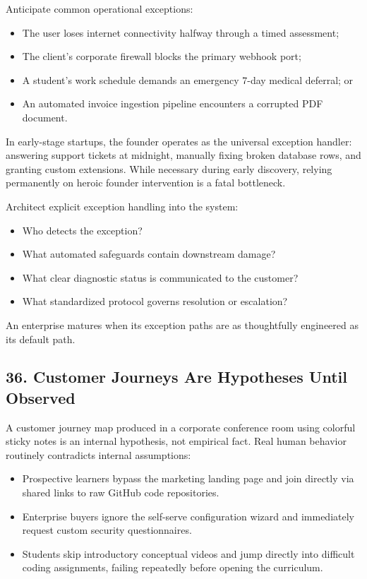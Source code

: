 Anticipate common operational exceptions:
\begin{itemize}
    \item The user loses internet connectivity halfway through a timed assessment;
    \item The client's corporate firewall blocks the primary webhook port;
    \item A student's work schedule demands an emergency 7-day medical deferral; or
    \item An automated invoice ingestion pipeline encounters a corrupted PDF document.
\end{itemize}

In early-stage startups, the founder operates as the universal exception handler: answering support tickets at midnight, manually fixing broken database rows, and granting custom extensions. While necessary during early discovery, relying permanently on heroic founder intervention is a fatal bottleneck.

Architect explicit exception handling into the system:
\begin{itemize}
    \item Who detects the exception?
    \item What automated safeguards contain downstream damage?
    \item What clear diagnostic status is communicated to the customer?
    \item What standardized protocol governs resolution or escalation?
\end{itemize}

An enterprise matures when its exception paths are as thoughtfully engineered as its default path.

\subsection*{36. Customer Journeys Are Hypotheses Until Observed}

A customer journey map produced in a corporate conference room using colorful sticky notes is an internal hypothesis, not empirical fact. Real human behavior routinely contradicts internal assumptions:
\begin{itemize}
    \item Prospective learners bypass the marketing landing page and join directly via shared links to raw GitHub code repositories.
    \item Enterprise buyers ignore the self-serve configuration wizard and immediately request custom security questionnaires.
    \item Students skip introductory conceptual videos and jump directly into difficult coding assignments, failing repeatedly before opening the curriculum.
\end{itemize}

